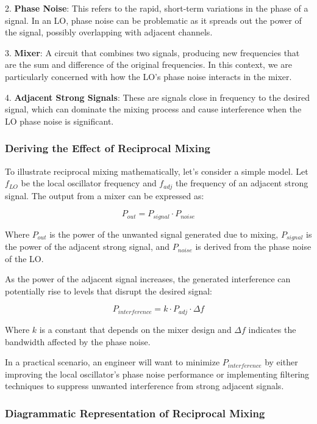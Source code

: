 2. \textbf{Phase Noise}: This refers to the rapid, short-term variations in the phase of a signal. In an LO, phase noise can be problematic as it spreads out the power of the signal, possibly overlapping with adjacent channels.

3. \textbf{Mixer}: A circuit that combines two signals, producing new frequencies that are the sum and difference of the original frequencies. In this context, we are particularly concerned with how the LO's phase noise interacts in the mixer.

4. \textbf{Adjacent Strong Signals}: These are signals close in frequency to the desired signal, which can dominate the mixing process and cause interference when the LO phase noise is significant.

\subsubsection{Deriving the Effect of Reciprocal Mixing}

To illustrate reciprocal mixing mathematically, let's consider a simple model. Let \(f_{LO}\) be the local oscillator frequency and \(f_{adj}\) the frequency of an adjacent strong signal. The output from a mixer can be expressed as:

\[
P_{out} = P_{signal} \cdot P_{noise}
\]

Where \(P_{out}\) is the power of the unwanted signal generated due to mixing, \(P_{signal}\) is the power of the adjacent strong signal, and \(P_{noise}\) is derived from the phase noise of the LO. 

As the power of the adjacent signal increases, the generated interference can potentially rise to levels that disrupt the desired signal:

\[
P_{interference} = k \cdot P_{adj} \cdot \Delta f
\]

Where \(k\) is a constant that depends on the mixer design and \(\Delta f\) indicates the bandwidth affected by the phase noise.

In a practical scenario, an engineer will want to minimize \(P_{interference}\) by either improving the local oscillator's phase noise performance or implementing filtering techniques to suppress unwanted interference from strong adjacent signals.

\subsubsection{Diagrammatic Representation of Reciprocal Mixing}

\begin{center}
\end{center}
